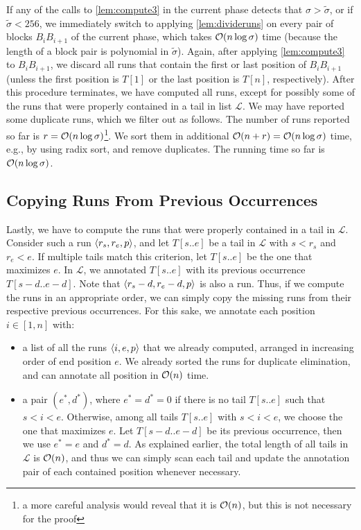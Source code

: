 If any of the calls to \cref{lem:compute3} in the current phase detects that $\sigma>\tilde{\sigma}$, or if $\tilde{\sigma} < 256$, we immediately switch to
applying \cref{lem:divideruns} on every pair of blocks $B_{i}B_{i+1}$ of the current phase, which takes $\mathcal{O}(n \log \sigma)$ time (because the length of a block pair is polynomial in $\tilde{\sigma}$). Again, after applying \cref{lem:compute3} to $B_{i}B_{i+1}$, we discard all runs that contain the first or last position of $B_{i}B_{i+1}$ (unless the first position is $T[1]$ or the last position is $T[n]$, respectively).
After this procedure terminates, we have computed all runs, except for possibly some of the runs that were properly contained in a tail in list $\mathcal L$.
We may have reported some duplicate runs, which we filter out as follows.
The number of runs reported so far is $r=\mathcal{O}(n\log\sigma)$\footnote{a more careful analysis would reveal that it is $\mathcal{O}(n)$, but this is not necessary for the proof}.
We sort them in additional $\mathcal{O}(n+r)=\mathcal{O}(n\log\sigma)$ time, e.g., by using radix sort, and remove duplicates.
The running time so far is $\mathcal{O}(n\log \sigma)$.

\subsection{Copying Runs From Previous Occurrences}
\label{square:sec:copyruns}

Lastly, we have to compute the runs that were properly contained in a tail in $\mathcal L$. 
Consider such a run $\left\langle r_s, r_e, p\right\rangle$, and let $T[s..e]$ be a tail in $\mathcal L$ with $s < r_s$ and $r_e < e$. If multiple tails match this criterion, let $T[s..e]$ be the one that maximizes $e$.
In $\mathcal L$, we annotated $T[s..e]$ with its previous occurrence $T[s-d..e-d]$.
Note that $\left\langle r_s - d, r_e - d, p\right\rangle$ is also a run.
Thus, if we compute the runs in an appropriate order, we can simply copy the missing runs from their respective previous occurrences. For this sake, we annotate each position $i \in [1, n]$ with:

\begin{itemize}
\item a list of all the runs $\left\langle i, e, p\right\rangle$ that we already computed, arranged in increasing order of end position $e$. We already sorted the runs for duplicate elimination, and can annotate all position in $\mathcal{O}(n)$ time.
\item a pair $(e^*, d^*)$, where $e^* = d^* = 0$ if there is no tail $T[s..e]$ such that $s < i < e$. Otherwise, among all tails $T[s..e]$ with $s < i < e$, we choose the one that maximizes $e$. Let $T[s-d..e-d]$ be its previous occurrence, then we use $e^* = e$ and $d^* = d$. As explained earlier, the total length of all tails in $\mathcal L$ is $\mathcal{O}(n)$, and thus we can simply scan each tail and update the annotation pair of each contained position whenever necessary.
\end{itemize}

